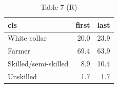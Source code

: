 \begin{table}

\caption{Table 7 (R)}
\centering
\begin{tabular}[t]{lrr}
\toprule
cls & first & last\\
\midrule
White collar & 20.0 & 23.9\\
Farmer & 69.4 & 63.9\\
Skilled/semi-skilled & 8.9 & 10.4\\
Unskilled & 1.7 & 1.7\\
\bottomrule
\end{tabular}
\end{table}
